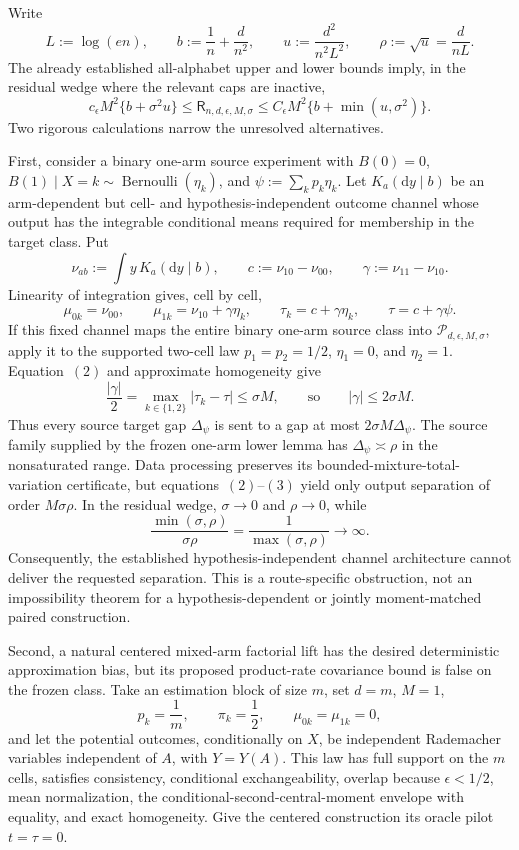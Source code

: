 Write
\[
 L:=\log(en),\qquad b:=\frac1n+\frac d{n^2},\qquad
 u:=\frac{d^2}{n^2L^2},\qquad \rho:=\sqrt u=\frac d{nL}.
\]
The already established all-alphabet upper and lower bounds imply, in the residual wedge where the relevant caps are inactive,
\[
 c_{\epsilon}M^2\{b+\sigma^2u\}
 \le \mathsf R_{n,d,\epsilon,M,\sigma}
 \le C_{\epsilon}M^2\{b+\min(u,\sigma^2)\}.
\tag{1}
\]
Two rigorous calculations narrow the unresolved alternatives.

First, consider a binary one-arm source experiment with \(B(0)=0\), \(B(1)\mid X=k\sim\operatorname{Bernoulli}(\eta_k)\), and \(\psi:=\sum_kp_k\eta_k\). Let \(K_a(\mathrm dy\mid b)\) be an arm-dependent but cell- and hypothesis-independent outcome channel whose output has the integrable conditional means required for membership in the target class. Put
\[
 \nu_{ab}:=\int y\,K_a(\mathrm dy\mid b),\qquad
 c:=\nu_{10}-\nu_{00},\qquad \gamma:=\nu_{11}-\nu_{10}.
\]
Linearity of integration gives, cell by cell,
\[
 \mu_{0k}=\nu_{00},\qquad
 \mu_{1k}=\nu_{10}+\gamma\eta_k,\qquad
 \tau_k=c+\gamma\eta_k,\qquad
 \tau=c+\gamma\psi.
\tag{2}
\]
If this fixed channel maps the entire binary one-arm source class into \(\mathcal P_{d,\epsilon,M,\sigma}\), apply it to the supported two-cell law \(p_1=p_2=1/2\), \(\eta_1=0\), and \(\eta_2=1\). Equation~\((2)\) and approximate homogeneity give
\[
 \frac{|\gamma|}{2}
 =\max_{k\in\{1,2\}}|\tau_k-\tau|
 \le \sigma M,
 \qquad\text{so}\qquad |\gamma|\le2\sigma M.
\tag{3}
\]
Thus every source target gap \(\Delta_{\psi}\) is sent to a gap at most \(2\sigma M\Delta_{\psi}\). The source family supplied by the frozen one-arm lower lemma has \(\Delta_{\psi}\asymp\rho\) in the nonsaturated range. Data processing preserves its bounded-mixture-total-variation certificate, but equations~\((2)\)--\((3)\) yield only output separation of order \(M\sigma\rho\). In the residual wedge, \(\sigma\to0\) and \(\rho\to0\), while
\[
 \frac{\min(\sigma,\rho)}{\sigma\rho}
 =\frac1{\max(\sigma,\rho)}\longrightarrow\infty.
\tag{4}
\]
Consequently, the established hypothesis-independent channel architecture cannot deliver the requested separation. This is a route-specific obstruction, not an impossibility theorem for a hypothesis-dependent or jointly moment-matched paired construction.

Second, a natural centered mixed-arm factorial lift has the desired deterministic approximation bias, but its proposed product-rate covariance bound is false on the frozen class. Take an estimation block of size \(m\), set \(d=m\), \(M=1\),
\[
 p_k=\frac1m,\qquad \pi_k=\frac12,\qquad
 \mu_{0k}=\mu_{1k}=0,
\]
and let the potential outcomes, conditionally on \(X\), be independent Rademacher variables independent of \(A\), with \(Y=Y(A)\). This law has full support on the \(m\) cells, satisfies consistency, conditional exchangeability, overlap because \(\epsilon<1/2\), mean normalization, the conditional-second-central-moment envelope with equality, and exact homogeneity. Give the centered construction its oracle pilot \(t=\tau=0\).

